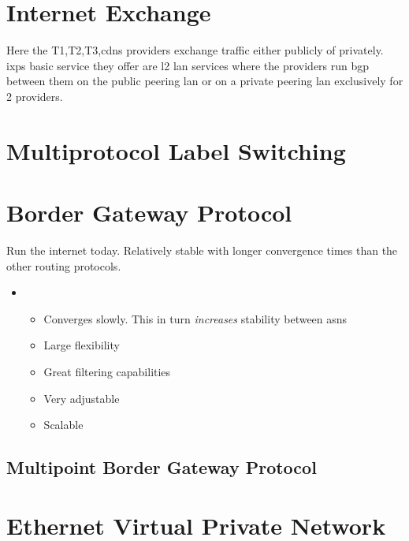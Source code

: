 \section[IXP]{Internet Exchange}

Here the T1,T2,T3,\Glspl{cdn} providers exchange traffic either publicly of privately. \Glspl{ixp} basic service they offer are \Gls{l2} lan services where the providers run \Gls{bgp} between them on the public peering lan or on a private peering lan exclusively for 2 providers.


\section[MPLS]{Multiprotocol Label Switching}

\section[BGP]{Border Gateway Protocol}

Run the internet today.
Relatively stable with longer convergence times than the other routing protocols.

\begin{itemize}
    \item {}
    \begin{itemize}
        \item Converges slowly. This in turn \textit{increases} stability between \Glspl{asn}
        \item Large flexibility
        \item Great filtering capabilities
        \item Very adjustable
        \item Scalable
    \end{itemize}
\end{itemize}

\subsection[MP-BGP]{Multipoint Border Gateway Protocol}

\section[EVPN]{Ethernet Virtual Private Network}
